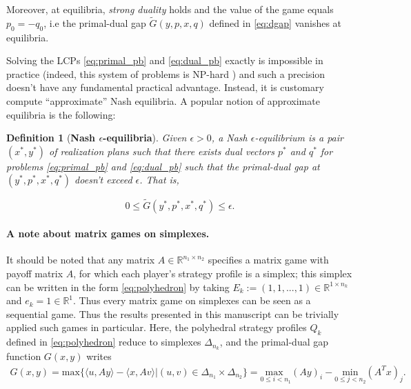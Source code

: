 \documentclass{article} %
\newtheorem{definition}[theorem]{Definition}
\begin{document}
Moreover, at equilibria, \textit{strong duality} holds and the value
of the game equals $p_0 = -q_0$, i.e the primal-dual gap
$\tilde{G}(y, p, x, q)$ defined in \eqref{eq:dgap} vanishes at
equilibria.

Solving the LCPs \eqref{eq:primal_pb} and \eqref{eq:dual_pb} exactly
is impossible in practice (indeed, this system of problems is NP-hard
\cite{koller1992complexity}) and such a precision doesn't have any
fundamental practical advantage. Instead, it is customary compute
``approximate'' Nash equilibria. A popular notion of approximate
equilibria is the following:

\begin{definition}[\textbf{Nash $\epsilon$-equilibria}]
Given $\epsilon > 0$, a Nash $\epsilon$-equilibrium is
a pair $(x^*, y^*)$ of realization plans such that there exists dual
vectors $p^*$ and $q^*$ for problems \eqref{eq:primal_pb} and
\eqref{eq:dual_pb} such that the primal-dual gap at $(y^*, p^*, x^*, q^*)$
doesn't exceed $\epsilon$. That is,

\begin{equation}
  0 \le \tilde{G}(y^*, p^*, x^*, q^*) \le \epsilon.
\label{eq:approx_pb}
\end{equation}
\label{thm:approx_nash}
\end{definition}

\paragraph{A note about matrix games on simplexes.} It should be
noted
that any matrix $A \in \mathbb{R}^{n_1 \times n_2}$ specifies a matrix
  game with payoff matrix $A$, for which each player's strategy
profile is a simplex; this simplex can be written in the form
\eqref{eq:polyhedron} by taking $E_k := (1, 1, ..., 1) \in
\mathbb{R}^{1 \times n_k}$ and $e_k = 1 \in \mathbb{R}^1$. Thus every
matrix game on simplexes can be seen as a sequential game.  Thus the
results presented in this manuscript can be trivially applied such
games in particular. Here, the polyhedral strategy profiles $Q_k$
defined in \eqref{eq:polyhedron} reduce to simplexes $\Delta_{n_k}$,
and the primal-dual gap function $G(x,y)$ writes
\begin{eqnarray}G(x, y) =
\mathrm{max}\{\langle u, Ay\rangle - \langle x, Av\rangle | (u,v) \in
\Delta_{n_1} \times \Delta_{n_2}\} = \underset{0 \le i <
  n_1}{\text{max }}(Ay)_i - \underset{0 \le j < n_2}{\text{min
}}(A^Tx)_j.
\label{eq:mg_pd}
\end{eqnarray}
\end{document}
